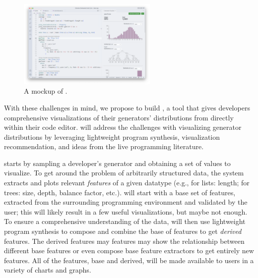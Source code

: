 \begin{figure}
  \centering
  \includegraphics[width=0.6\textwidth]{assets/gen-vis.png}
  \caption{A mockup of \genvis.  }\label{fig:gen-vis}
\end{figure}

With these challenges in mind, we propose to build \genvis, a tool that
gives developers comprehensive visualizations of their generators' distributions
from directly within their code editor. \genvis{} will address the challenges
with visualizing generator distributions by leveraging lightweight program
synthesis, visualization recommendation, and ideas from the live programming
literature.

\genvis{} starts by sampling a developer's generator and obtaining a set of
values to visualize. To get around the problem of arbitrarily structured data,
the system extracts and plots relevant {\em features} of a given datatype (e.g.,
for lists: length; for trees: size, depth, balance factor, etc.). \genvis{} will
start with a base set of features, extracted from the surrounding programming
environment and validated by the user; this will likely result in a few useful
visualizations, but maybe not enough. To ensure a comprehensive understanding of
the data, \genvis{} will then use lightweight program synthesis to compose and
combine the base of features to get {\em derived} features. The derived features
may features may show the relationship between different base features or even
compose base feature extractors to get entirely new features.  All of the
features, base and derived, will be made available to users in a variety of
charts and graphs.

